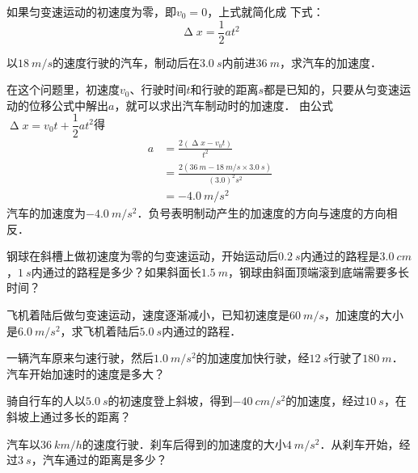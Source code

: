 如果匀变速运动的初速度为零，即$v_0=0$，上式就简化成
下式：
\[\upDelta x=\frac{1}{2}at^2  \]

\begin{Example}
    以$\qty{18}{m/s}$的速度行驶的汽车，制动后在$\qty{3.0}{s}$内前进$\qty{36}{m}$，求汽车的加速度．
\end{Example}

\begin{Answer}
    在这个问题里，初速度$v_0$、行驶时间$t$和行驶的距离$s$都是已知的，只要从匀变速运动的位移公式中解出$a$，就可以求出汽车制动时的加速度．
    由公式$\upDelta x=v_0t+\dfrac{1}{2}at^2$得
    \[\begin{split}
            a & =\frac{2(\upDelta x-v_0t)}{t^2}                                          \\
              & =\frac{2(\qty{36}{m}-\qty{18}{m/s}\times \qty{3.0}{s})}{(3.0)^2\si{s^2}} \\
              & =\qty{-4.0}{m/s^2}
        \end{split} \]
    汽车的加速度为$\qty{-4.0}{m/s^2}$．负号表明制动产生的加速度的方向与速度的方向相反．
\end{Answer}


\begin{Exercise}
	\begin{QsNum}
	    \item 钢球在斜槽上做初速度为零的匀变速运动，开始运动后$\qty{0.2}{s}$内通过的路程是$\qty{3.0}{cm}$，$\qty{1}{s}$内通过的路程是多少？如果斜面长$\qty{1.5}{m}$，钢球由斜面顶端滚到底端需要多长时间？
	
	    \item 飞机着陆后做匀变速运动，速度逐渐减小，已知初速度是$\qty{60}{m/s}$，加速度的大小是$\qty{6.0}{m/s^2}$，求飞机着陆后$\qty{5.0}{s}$内通过的路程．
	
	    \item 一辆汽车原来匀速行驶，然后$\qty{1.0}{m/s^2}$的加速度加快行驶，经$\qty{12}{s}$行驶了$\qty{180}{m}$．汽车开始加速时的速度是多大？
	
	    \item 骑自行车的人以$\qty{5.0}{s}$的初速度登上斜坡，得到$\qty{-40}{cm/s^2}$的加速度，经过$\qty{10}{s}$，在斜坡上通过多长的距离？
	
	    \item 汽车以$\qty{36}{km/h}$的速度行驶．刹车后得到的加速度的大小$\qty{4}{m/s^2}$．从刹车开始，经过$\qty{3}{s}$，汽车通过的距离是多少？
    \end{QsNum}
\end{Exercise}





